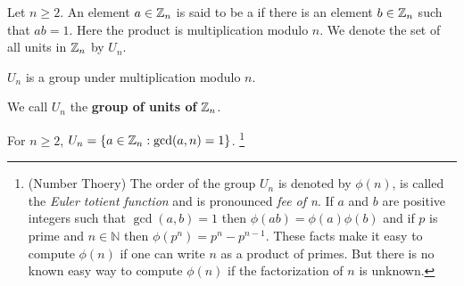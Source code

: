 \begin{defn} Let $n \ge 2$. An element $a \in \mathbb Z_n$ is said to be a  if there is an element $b \in \mathbb Z_n$ such that 
        $ab =1$. Here the product is multiplication modulo $n$. We denote the
        set of all units in $\mathbb Z_n$ by $U_n$. 
\end{defn}
\begin{comment}
\noindent Note that 2 is a unit in $\Z_5$ since $2 \cdot 3=1$. Since the
multiplication is commutative, 2 and 3 are both units. We say that 2 and
3 are inverses of each other. But note that if we write
$2^{-1}=3$,  we must keep in mind that by $2^{-1}$ in this context we do
not mean the rational number $1/2$. The following theorem is easy to
prove if we assume that multiplication modulo
$n$ is associative and commutative.
\end{comment}

\begin{thm} $U_n$ is a group under multiplication modulo $n$.
\end{thm}
\noindent We call $U_n$ the \textbf{group of units of} $\mathbb Z_n$.

\begin{thm} \label{Th5.2} For $n \ge 2$, $U_n = \{ a \in \mathbb Z_n:
        \gcd(a,n)=1 \}$.
        \footnote{
                (Number Thoery) The order of the group $U_n$ is denoted by $\phi(n)$, is called the \emph{Euler totient
                        function} and is  pronounced \emph{fee of n}. If $a$ and $b$ are positive integers such that $\gcd(a,b)=1$
                then $\phi(ab) = \phi(a)\phi(b)$ and if $p$ is prime and $n \in \mathbb{N}$ then $\phi(p^n) = p^n - p^{n-1}$.  These facts make it easy to compute $\phi(n)$ if one can write $n$ as a product of primes. But there is no known easy way to compute $\phi(n)$ if the factorization of 
                $n$ is unknown. 
        }
\end{thm}

